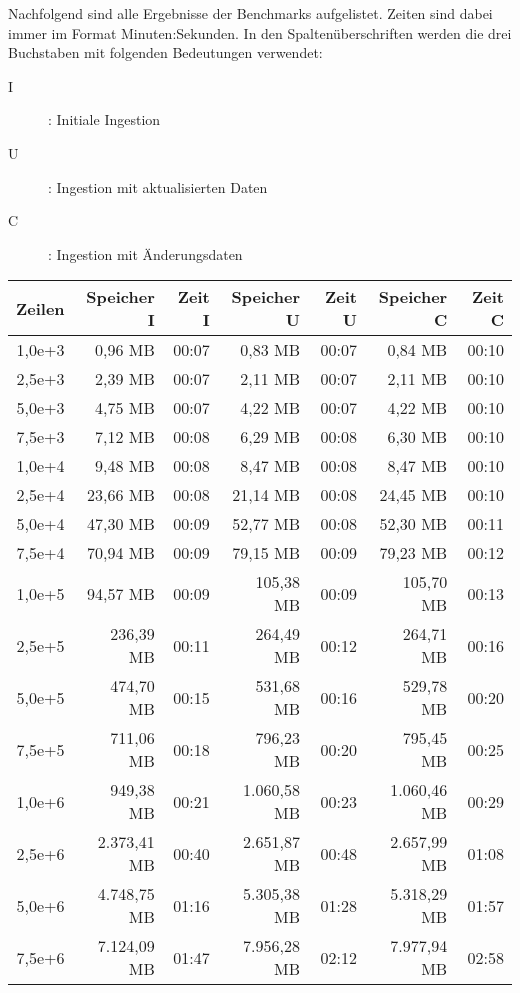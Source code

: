 \label{sec:benchmark-tables}
Nachfolgend sind alle Ergebnisse der Benchmarks aufgelistet.
Zeiten sind dabei immer im Format Minuten:Sekunden.
In den Spaltenüberschriften werden die drei Buchstaben mit folgenden Bedeutungen verwendet:
\begin{description}
    \item[I]: Initiale Ingestion
    \item[U]: Ingestion mit aktualisierten Daten
    \item[C]: Ingestion mit Änderungsdaten
\end{description}

\begin{table}
    \centering
    \begin{tabular}{|r|r|r|r|r|r|r|}
        \hline
        \textbf{Zeilen} & \textbf{Speicher I} & \textbf{Zeit I} & \textbf{Speicher U} & \textbf{Zeit U} & \textbf{Speicher C} & \textbf{Zeit C} \\ \hline
        1,0e+3 & 0,96 MB       & 00:07 & 0,83 MB       & 00:07 & 0,84 MB       & 00:10 \\ \hline
        2,5e+3 & 2,39 MB       & 00:07 & 2,11 MB       & 00:07 & 2,11 MB       & 00:10 \\ \hline
        5,0e+3 & 4,75 MB       & 00:07 & 4,22 MB       & 00:07 & 4,22 MB       & 00:10 \\ \hline
        7,5e+3 & 7,12 MB       & 00:08 & 6,29 MB       & 00:08 & 6,30 MB       & 00:10 \\ \hline
        1,0e+4 & 9,48 MB       & 00:08 & 8,47 MB       & 00:08 & 8,47 MB       & 00:10 \\ \hline
        2,5e+4 & 23,66 MB      & 00:08 & 21,14 MB      & 00:08 & 24,45 MB      & 00:10 \\ \hline
        5,0e+4 & 47,30 MB      & 00:09 & 52,77 MB      & 00:08 & 52,30 MB      & 00:11 \\ \hline
        7,5e+4 & 70,94 MB      & 00:09 & 79,15 MB      & 00:09 & 79,23 MB      & 00:12 \\ \hline
        1,0e+5 & 94,57 MB      & 00:09 & 105,38 MB     & 00:09 & 105,70 MB     & 00:13 \\ \hline
        2,5e+5 & 236,39 MB     & 00:11 & 264,49 MB     & 00:12 & 264,71 MB     & 00:16 \\ \hline
        5,0e+5 & 474,70 MB     & 00:15 & 531,68 MB     & 00:16 & 529,78 MB     & 00:20 \\ \hline
        7,5e+5 & 711,06 MB     & 00:18 & 796,23 MB     & 00:20 & 795,45 MB     & 00:25 \\ \hline
        1,0e+6 & 949,38 MB     & 00:21 & 1.060,58 MB   & 00:23 & 1.060,46 MB   & 00:29 \\ \hline
        2,5e+6 & 2.373,41 MB   & 00:40 & 2.651,87 MB   & 00:48 & 2.657,99 MB   & 01:08 \\ \hline
        5,0e+6 & 4.748,75 MB   & 01:16 & 5.305,38 MB   & 01:28 & 5.318,29 MB   & 01:57 \\ \hline
        7,5e+6 & 7.124,09 MB   & 01:47 & 7.956,28 MB   & 02:12 & 7.977,94 MB   & 02:58 \\ \hline


\end{tabular}
\end{table}
